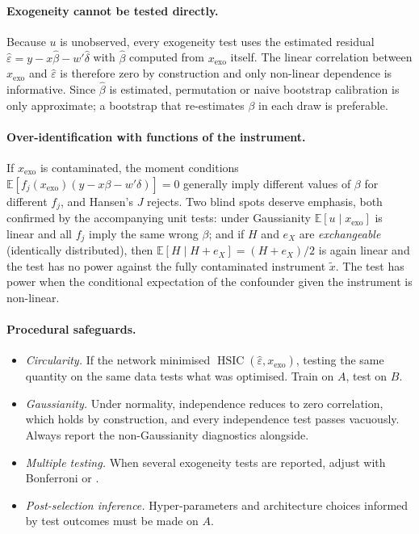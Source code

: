 \documentclass[11pt]{article}
\theoremstyle{definition}
\theoremstyle{remark}
\newcommand{\E}{\mathbb{E}}
\newcommand{\HSIC}{\operatorname{HSIC}}
\newcommand{\xexo}{x_{\mathrm{exo}}}
\newcommand{\tx}{\tilde{x}}
\begin{document}
\paragraph{Exogeneity cannot be tested directly.} Because $u$ is unobserved, every exogeneity test
uses the estimated residual $\hat\varepsilon = y - x\hat\beta - w'\hat\delta$ with $\hat\beta$
computed from $\xexo$ itself. The linear correlation between $\xexo$ and $\hat\varepsilon$ is
therefore zero by construction and only non-linear dependence is informative. Since $\hat\beta$ is
estimated, permutation or naive bootstrap calibration is only approximate; a bootstrap that
re-estimates $\beta$ in each draw is preferable.

\paragraph{Over-identification with functions of the instrument.} If $\xexo$ is contaminated, the
moment conditions $\E[f_j(\xexo)(y-x\beta-w'\delta)]=0$ generally imply different values of $\beta$
for different $f_j$, and Hansen's $J$ rejects. Two blind spots deserve emphasis, both confirmed by
the accompanying unit tests: under Gaussianity $\E[u\mid\xexo]$ is linear and all $f_j$ imply the
same wrong $\beta$; and if $H$ and $e_X$ are \emph{exchangeable} (identically distributed), then
$\E[H\mid H+e_X] = (H+e_X)/2$ is again linear and the test has no power against the fully
contaminated instrument $\tx$. The test has power when the conditional expectation of the
confounder given the instrument is non-linear.

\paragraph{Procedural safeguards.}
\begin{itemize}
  \item \emph{Circularity.} If the network minimised $\HSIC(\hat\varepsilon,\xexo)$, testing the same
  quantity on the same data tests what was optimised. Train on $A$, test on $B$.
  \item \emph{Gaussianity.} Under normality, independence reduces to zero correlation, which holds
  by construction, and every independence test passes vacuously. Always report the
  non-Gaussianity diagnostics alongside.
  \item \emph{Multiple testing.} When several exogeneity tests are reported, adjust with
  Bonferroni or \citet{holm1979}.
  \item \emph{Post-selection inference.} Hyper-parameters and architecture choices informed by test
  outcomes must be made on $A$.
\end{itemize}
\end{document}
